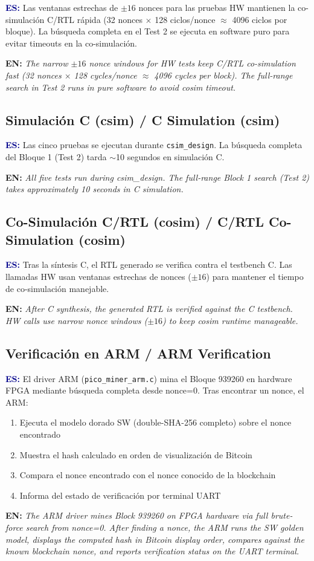 \documentclass[12pt,a4paper]{article}
\newcommand{\bsubsection}[2]{%
    \subsection{#1 \textnormal{\small\color{accentblue}/ #2}}%
}
\newenvironment{bilingual}{%
    \par\medskip
}{%
    \par\medskip
}
\newcommand{\espara}[1]{\noindent\textcolor{darkblue}{\textbf{ES:}} #1\par\smallskip}
\newcommand{\enpara}[1]{\noindent\textcolor{accentblue}{\textbf{EN:}} \textit{#1}\par\smallskip}
\begin{document}
\begin{bilingual}
\espara{%
Las ventanas estrechas de $\pm16$ nonces para las pruebas HW mantienen la
co-simulaci\'on C/RTL r\'apida (32 nonces $\times$ 128 ciclos/nonce $\approx$
4096 ciclos por bloque). La b\'usqueda completa en el Test 2 se ejecuta en
software puro para evitar timeouts en la co-simulaci\'on.}

\enpara{%
The narrow $\pm16$ nonce windows for HW tests keep C/RTL co-simulation fast
(32 nonces $\times$ 128 cycles/nonce $\approx$ 4096 cycles per block). The
full-range search in Test 2 runs in pure software to avoid cosim timeout.}
\end{bilingual}

\bsubsection{Simulaci\'on C (csim)}{C Simulation (csim)}

\begin{bilingual}
\espara{%
Las cinco pruebas se ejecutan durante \texttt{csim\_design}. La b\'usqueda completa
del Bloque 1 (Test 2) tarda $\sim$10 segundos en simulaci\'on C.}

\enpara{%
All five tests run during csim\_design. The full-range Block 1 search (Test 2)
takes approximately 10 seconds in C simulation.}
\end{bilingual}

\bsubsection{Co-Simulaci\'on C/RTL (cosim)}{C/RTL Co-Simulation (cosim)}

\begin{bilingual}
\espara{%
Tras la s\'intesis C, el RTL generado se verifica contra el testbench C.
Las llamadas HW usan ventanas estrechas de nonces ($\pm16$) para mantener
el tiempo de co-simulaci\'on manejable.}

\enpara{%
After C synthesis, the generated RTL is verified against the C testbench.
HW calls use narrow nonce windows ($\pm16$) to keep cosim runtime manageable.}
\end{bilingual}

\bsubsection{Verificaci\'on en ARM}{ARM Verification}

\begin{bilingual}
\espara{%
El driver ARM (\texttt{pico\_miner\_arm.c}) mina el Bloque 939260 en hardware FPGA
mediante b\'usqueda completa desde nonce=0. Tras encontrar un nonce, el ARM:
\begin{enumerate}[leftmargin=2em]
    \item Ejecuta el modelo dorado SW (double-SHA-256 completo) sobre el nonce encontrado
    \item Muestra el hash calculado en orden de visualizaci\'on de Bitcoin
    \item Compara el nonce encontrado con el nonce conocido de la blockchain
    \item Informa del estado de verificaci\'on por terminal UART
\end{enumerate}}

\enpara{%
The ARM driver mines Block 939260 on FPGA hardware via full brute-force search
from nonce=0. After finding a nonce, the ARM runs the SW golden model, displays
the computed hash in Bitcoin display order, compares against the known blockchain
nonce, and reports verification status on the UART terminal.}
\end{bilingual}
\end{document}
